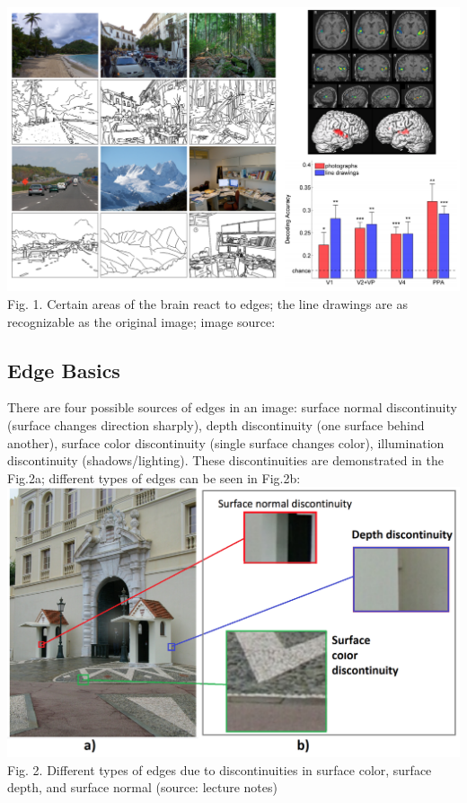 \documentclass{article}
\begin{document}
\includegraphics[width=\textwidth]{line_drawings.png}
Fig. 1. Certain areas of the brain react to edges; the line drawings are as recognizable as the original image; image source: \cite{line_drawings}

\subsection{Edge Basics}
There are four possible sources of edges in an image:  surface normal discontinuity (surface changes direction sharply), depth discontinuity (one surface behind another), surface color discontinuity (single surface changes color), illumination discontinuity (shadows/lighting).  These discontinuities are demonstrated in the Fig.2a; different types of edges can be seen in Fig.2b:
\FloatBarrier
\includegraphics[width=\textwidth]{overall.png}
\FloatBarrier
Fig. 2. Different types of edges due to discontinuities in surface color, surface depth, and surface normal (source: lecture notes)
\end{document}
